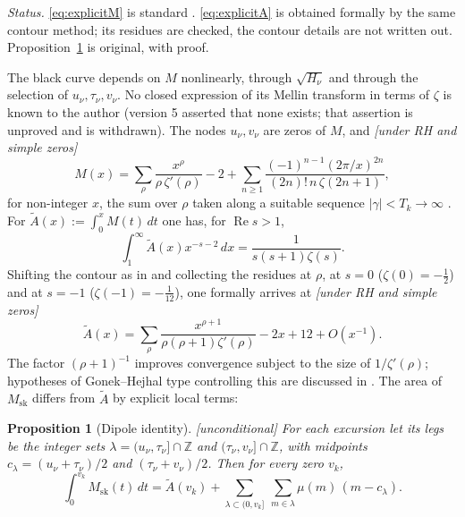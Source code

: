 \documentclass[11pt]{amsart}
\numberwithin{equation}{section}
\theoremstyle{plain}
\newtheorem{proposition}[theorem]{Proposition}
\theoremstyle{definition}
\theoremstyle{remark}
\newcommand{\Msk}{M_{\mathrm{sk}}}
\begin{document}
\noindent\emph{Status.} \eqref{eq:explicitM} is standard
\cite[\S14.27]{Titchmarsh1986}. \eqref{eq:explicitA} is obtained formally
by the same contour method; its residues are checked, the contour details
are not written out. Proposition~\ref{prop:dipoles} is original, with proof.

\medskip

The black curve depends on $M$ nonlinearly, through $\sqrt{H_\nu}$ and
through the selection of $u_\nu,\tau_\nu,v_\nu$. No closed expression of its
Mellin transform in terms of $\zeta$ is known to the author (version 5
asserted that none exists; that assertion is unproved and is withdrawn). The
nodes $u_\nu,v_\nu$ are zeros of $M$, and \emph{[under RH and simple zeros]}
\begin{equation}
\label{eq:explicitM}
  M(x)=\sum_{\rho}\frac{x^\rho}{\rho\,\zeta'(\rho)}-2
  +\sum_{n\ge1}\frac{(-1)^{n-1}(2\pi/x)^{2n}}{(2n)!\,n\,\zeta(2n+1)},
\end{equation}
for non-integer $x$, the sum over $\rho$ taken along a suitable sequence
$|\gamma|<T_k\to\infty$ \cite[\S14.27]{Titchmarsh1986}. For
$\widetilde{A}(x):=\int_0^xM(t)\,dt$ one has, for $\operatorname{Re}s>1$,
\begin{equation}
\label{eq:mellin_A}
  \int_1^\infty \widetilde{A}(x)x^{-s-2}\,dx=\frac{1}{s(s+1)\zeta(s)}.
\end{equation}
Shifting the contour as in \cite[\S14.27]{Titchmarsh1986} and collecting the
residues at $\rho$, at $s=0$ ($\zeta(0)=-\tfrac12$) and at $s=-1$
($\zeta(-1)=-\tfrac1{12}$), one formally arrives at \emph{[under RH and
simple zeros]}
\begin{equation}
\label{eq:explicitA}
  \widetilde{A}(x)=\sum_\rho\frac{x^{\rho+1}}{\rho(\rho+1)\zeta'(\rho)}
  -2x+12+O(x^{-1}).
\end{equation}
The factor $(\rho+1)^{-1}$ improves convergence subject to the size of
$1/\zeta'(\rho)$; hypotheses of Gonek--Hejhal type controlling this are
discussed in \cite{Ng2004}. The area of $\Msk$ differs from
$\widetilde{A}$ by explicit local terms:

\begin{proposition}[Dipole identity]
\label{prop:dipoles}
\emph{[unconditional]} For each excursion let its \emph{legs} be the integer
sets $\lambda=(u_\nu,\tau_\nu]\cap\mathbb{Z}$ and $(\tau_\nu,v_\nu]\cap\mathbb{Z}$,
with midpoints $c_\lambda=(u_\nu+\tau_\nu)/2$ and $(\tau_\nu+v_\nu)/2$. Then
for every zero $v_k$,
\begin{equation}
\label{eq:dipoles}
  \int_0^{v_k}\Msk(t)\,dt=\widetilde{A}(v_k)
  +\sum_{\lambda\subset(0,v_k]}\ \sum_{m\in\lambda}\mu(m)\,(m-c_\lambda).
\end{equation}
\end{proposition}
\end{document}
